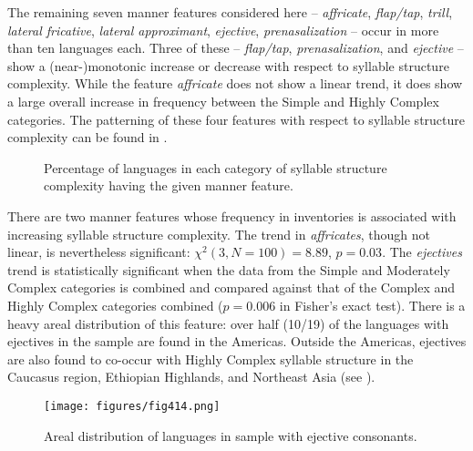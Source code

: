   The remaining seven manner features considered here -- \textit{affricate}, \textit{flap/tap}, \textit{trill}, \textit{lateral fricative}, \textit{lateral approximant}, \textit{ejective}, \textit{prenasalization} -- occur in more than ten languages each. Three of these --  \textit{flap/tap}, \textit{prenasalization}, and \textit{ejective} -- show a (near-)monotonic increase or decrease with respect to syllable structure complexity. While the feature \textit{affricate} does not show a linear trend, it does show a large overall increase in frequency between the Simple and Highly Complex categories. The patterning of these four features with respect to syllable structure complexity can be found in .

\begin{figure}
\caption{\label{fig:4.13}Percentage of languages in each category of syllable structure complexity having the given manner feature.}
\end{figure}

  There are two manner features whose frequency in inventories is associated with increasing syllable structure complexity. The trend in \textit{affricates}, though not linear, is nevertheless significant: $\chi^2(3, N = 100) = 8.89$, $p = 0.03$. The \textit{ejectives} trend is statistically significant when the data from the Simple and Moderately Complex categories is combined and compared against that of the Complex and Highly Complex categories combined ($p =0.006$ in Fisher’s exact test). There is a heavy areal distribution of this feature: over half (10/19) of the languages with ejectives in the sample are found in the Americas. Outside the Americas, ejectives are also found to co-occur with Highly Complex syllable structure in the Caucasus region, Ethiopian Highlands, and Northeast Asia (see ).
\vfill
\begin{figure}  
\texttt{[image: figures/fig414.png]}
\caption{\label{fig:4.14}Areal distribution of languages in sample with ejective consonants.}
\end{figure}
\vfill\pagebreak

